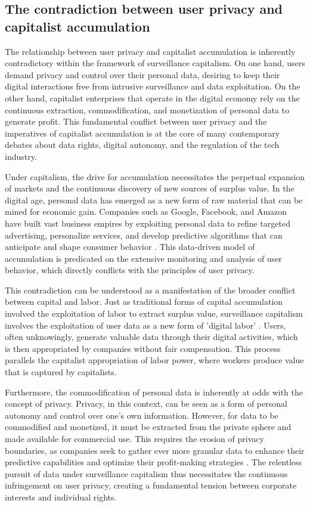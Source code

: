 \subsection{The contradiction between user privacy and capitalist accumulation}

The relationship between user privacy and capitalist accumulation is inherently contradictory within the framework of surveillance capitalism. On one hand, users demand privacy and control over their personal data, desiring to keep their digital interactions free from intrusive surveillance and data exploitation. On the other hand, capitalist enterprises that operate in the digital economy rely on the continuous extraction, commodification, and monetization of personal data to generate profit. This fundamental conflict between user privacy and the imperatives of capitalist accumulation is at the core of many contemporary debates about data rights, digital autonomy, and the regulation of the tech industry.

Under capitalism, the drive for accumulation necessitates the perpetual expansion of markets and the continuous discovery of new sources of surplus value. In the digital age, personal data has emerged as a new form of raw material that can be mined for economic gain. Companies such as Google, Facebook, and Amazon have built vast business empires by exploiting personal data to refine targeted advertising, personalize services, and develop predictive algorithms that can anticipate and shape consumer behavior \cite[pp.~65-68]{zuboff2020age}. This data-driven model of accumulation is predicated on the extensive monitoring and analysis of user behavior, which directly conflicts with the principles of user privacy.

This contradiction can be understood as a manifestation of the broader conflict between capital and labor. Just as traditional forms of capital accumulation involved the exploitation of labor to extract surplus value, surveillance capitalism involves the exploitation of user data as a new form of 'digital labor' \cite[pp.~146-149]{fuchs2014digital}. Users, often unknowingly, generate valuable data through their digital activities, which is then appropriated by companies without fair compensation. This process parallels the capitalist appropriation of labor power, where workers produce value that is captured by capitalists.

Furthermore, the commodification of personal data is inherently at odds with the concept of privacy. Privacy, in this context, can be seen as a form of personal autonomy and control over one’s own information. However, for data to be commodified and monetized, it must be extracted from the private sphere and made available for commercial use. This requires the erosion of privacy boundaries, as companies seek to gather ever more granular data to enhance their predictive capabilities and optimize their profit-making strategies \cite[pp.~34-37]{cohen2019between}. The relentless pursuit of data under surveillance capitalism thus necessitates the continuous infringement on user privacy, creating a fundamental tension between corporate interests and individual rights.


